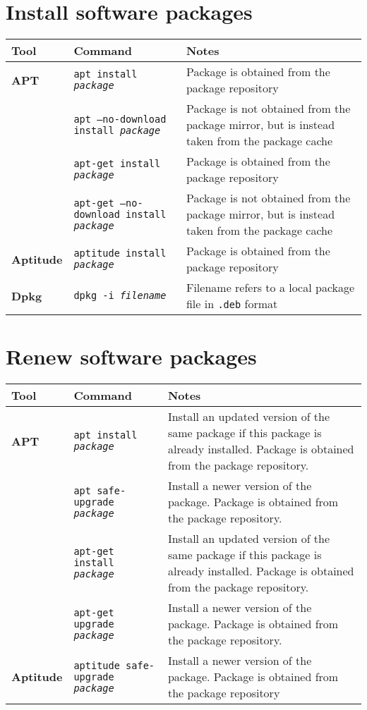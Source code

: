 \documentclass[10pt]{article}
\begin{document}
\cheatsheet

\section{Install software packages}
\begin{tabular}{ p{3.5cm} p{9cm} p{11cm}}
  \hline
  \rowcolor{Gray}
  \textbf{Tool} & \textbf{Command} & \textbf{Notes} \\
  \hline 
  \textbf{APT} & \texttt{apt install \textit{package}} & Package is obtained from the package repository \\
  \rowcolor{Gray}
   & \texttt{apt --no-download install \textit{package}} & Package is not obtained from the package mirror, but is instead taken from the package cache \\ 
   & \texttt{apt-get install \textit{package}} & Package is obtained from the package repository \\
  \rowcolor{Gray}
   & \texttt{apt-get --no-download install \textit{package}} & Package is not obtained from the package mirror, but is instead taken from the package cache \\
  \textbf{Aptitude} & \texttt{aptitude install \textit{package}} & Package is obtained from the package repository \\
  \rowcolor{Gray}
  \textbf{Dpkg} & \texttt{dpkg -i \textit{filename}} & Filename refers to a local package file in \texttt{.deb} format \\
  \hline
\end{tabular}

\section{Renew software packages}
\begin{tabular}{ p{3.5cm} p{9cm} p{11cm}}
  \hline
  \rowcolor{Gray}
  \textbf{Tool} & \textbf{Command} & \textbf{Notes} \\
  \hline 
  \textbf{APT} & \texttt{apt install \textit{package}} & Install an updated version of the same package if this package is already installed. Package is obtained from the package repository. \\
  \rowcolor{Gray}
   & \texttt{apt safe-upgrade \textit{package}} &  Install a newer version of the package. Package is obtained from the package repository. \\
   & \texttt{apt-get install \textit{package}} & Install an updated version of the same package if this package is already installed. Package is obtained from the package repository. \\
  \rowcolor{Gray}
   & \texttt{apt-get upgrade \textit{package}} & Install a newer version of the package. Package is obtained from the package repository. \\
  \textbf{Aptitude} & \texttt{aptitude safe-upgrade \textit{package}} & Install a newer version of the package. Package is obtained from the package repository \\
  \hline
\end{tabular}
\end{document}
